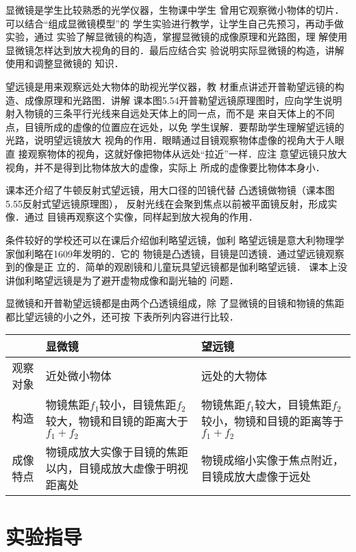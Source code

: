 显微镜是学生比较熟悉的光学仪器，生物课中学生
曾用它观察微小物体的切片．可以结合“组成显微镜模型”的
学生实验进行教学，让学生自己先预习，再动手做实验，通过
实验了解显微镜的构造，掌握显微镜的成像原理和光路图，理
解使用显微镜怎样达到放大视角的目的．最后应结合实
验说明实际显微镜的构造，讲解使用和调整显微镜的
知识．

望远镜是用来观察远处大物体的助视光学仪器，教
材重点讲述开普勒望远镜的构造、成像原理和光路图．讲解
课本图5.54开普勒望远镜原理图时，应向学生说明
射入物镜的三条平行光线来自远处天体上的同一点，而不是
来自天体上的不同点，目镜所成的虚像的位置应在远处，以免
学生误解．要帮助学生理解望远镜的光路，说明望远镜放大
视角的作用．眼睛通过目镜观察物体虚像的视角大于人眼直
接观察物体的视角，这就好像把物体从远处“拉近”一样．应注
意望远镜只放大视角，并不是得到比物体放大的虚像，实际上
所成的虚像要比物体本身小．

课本还介绍了牛顿反射式望远镜，用大口径的凹镜代替
凸透镜做物镜（课本图5.55反射式望远镜原理图），
反射光线在会聚到焦点以前被平面镜反射，形成实像．通过
目镜再观察这个实像，同样起到放大视角的作用．

条件较好的学校还可以在课后介绍伽利略望远镜，伽利
略望远镜是意大利物理学家伽利略在1609年发明的．它的
物镜是凸透镜，目镜是凹透镜．通过望远镜观察到的像是正
立的．简单的观剧镜和儿童玩具望远镜都是伽利略望远镜．
课本上没讲伽利略望远镜是为了避开虚物成像和副光轴的
问题．

显微镜和开普勒望远镜都是由两个凸透镜组成，除
了显微镜的目镜和物镜的焦距都比望远镜的小之外，还可按
下表所列内容进行比较．

\begin{center}
\begin{tabular}{cp{}p{}}
    \hline
   & 显微镜&    望远镜\\
    \hline
    观察对象&近处微小物体&    远处的大物体\\\hline
    构造&物镜焦距$f_1$较小，目镜焦距$f_2$较大，物镜和目镜的距离大于$f_1+f_2$  &
    物镜焦距$f_1$较大，目镜焦距$f_2$较小，物镜和目镜的距离等于$f_1+f_2$\\\hline
    成像特点&物镜成放大实像于目镜的焦距以内，目镜成放大虚像于明视距离处 &
    物镜成缩小实像于焦点附近，目镜成放大虚像于远处 \\
    \hline
\end{tabular}
\end{center}

\section{实验指导}
